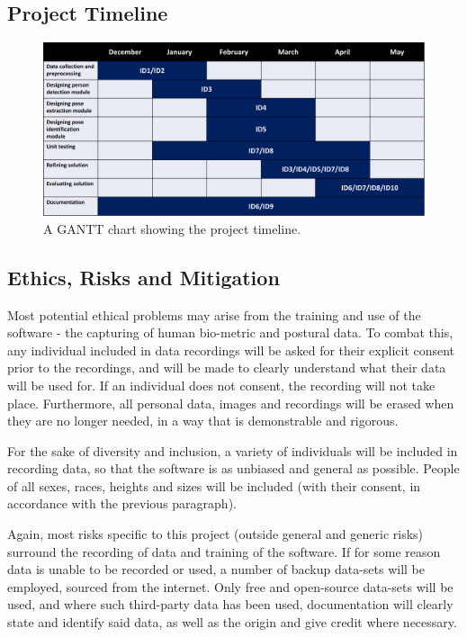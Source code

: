 \documentclass[a4paper, oneside, 11pt]{article}
\begin{document}
\subsection{Project Timeline}

\begin{figure}[ht]
    \centering
    \includegraphics[scale = 0.5]{img/gantt.png}
    \caption{A GANTT chart showing the project timeline.}
    \label{fig:gantt}
\end{figure}

\subsection{Ethics, Risks and Mitigation}

Most potential ethical problems may arise from the training and use of the software - the capturing of human bio-metric and postural data. To combat this, any individual included in data recordings will be asked for their explicit consent prior to the recordings, and will be made to clearly understand what their data will be used for. If an individual does not consent, the recording will not take place. Furthermore, all personal data, images and recordings will be erased when they are no longer needed, in a way that is demonstrable and rigorous.

For the sake of diversity and inclusion, a variety of individuals will be included in recording data, so that the software is as unbiased and general as possible. People of all sexes, races, heights and sizes will be included (with their consent, in accordance with the previous paragraph).

Again, most risks specific to this project (outside general and generic risks) surround the recording of data and training of the software. If for some reason data is unable to be recorded or used, a number of backup data-sets will be employed, sourced from the internet. Only free and open-source data-sets will be used, and where such third-party data has been used, documentation will clearly state and identify said data, as well as the origin and give credit where necessary.
\end{document}
